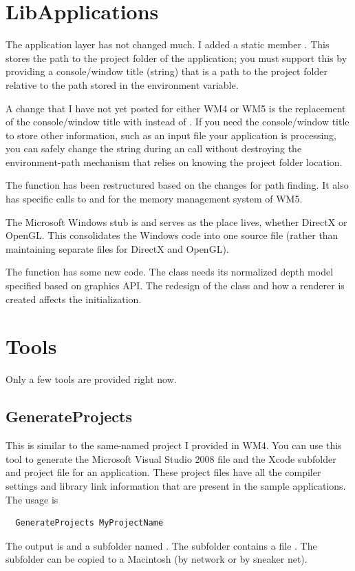 \documentclass{article}
\begin{document}
\section{LibApplications}

The application layer has not changed much.  I added a static member
.  This stores the
path to the project folder of the application; you must support this by
providing a console/window title (string) that is a path to the project
folder relative to the path stored in the  environment
variable.

A change that I have not yet posted for either WM4 or WM5 is the replacement
of the console/window title with  instead of
.  If you need the console/window title to store other
information, such as an input file your application is processing, you can
safely change the string during an  call without destroying
the environment-path mechanism that relies on knowing the project folder
location.

The  function has been restructured based on the changes for
path finding.  It also has specific calls to  and
 for the memory management system of WM5.

The Microsoft Windows stub is  and serves
as the place  lives, whether DirectX or
OpenGL.  This consolidates the Windows code into one source file (rather
than maintaining separate files for DirectX and OpenGL).

The  function has some new code.  The  class needs
its normalized depth model specified based on graphics API.  The redesign
of the  class and how a renderer is created affects the
initialization.

\section{Tools}

Only a few tools are provided right now.

\subsection{GenerateProjects}

This is similar to the same-named project I provided in WM4.  You can use
this tool to generate the Microsoft Visual Studio 2008  file
and the Xcode subfolder and project file for an application.  These
project files have all the compiler settings and library link information
that are present in the sample applications.  The usage is
\begin{verbatim}
  GenerateProjects MyProjectName
\end{verbatim}
The output is  and a subfolder named
.  The subfolder contains a file
.  The subfolder can be copied to a Macintosh
(by network or by sneaker net).
\end{document}
